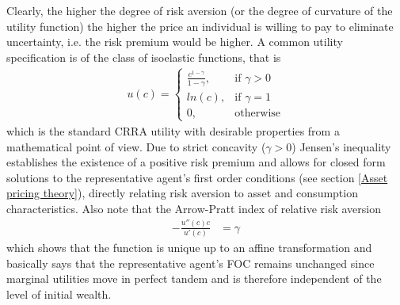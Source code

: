 Clearly, the higher the degree of risk aversion (or the degree of curvature of the utility function) the higher the price an individual is willing to pay to eliminate uncertainty, i.e. the risk premium would be higher. A common utility specification is of the class of isoelastic functions, that is 
\begin{align*}
    u(c)=
    \begin{cases}
        \frac{c^{1-\gamma}}{1-\gamma},& \text{if } \gamma > 0\\
        ln(c), & \text{if } \gamma = 1\\
        0, & \text{otherwise}
    \end{cases}
\end{align*}
which is the standard CRRA utility with desirable properties from a mathematical point of view. Due to strict concavity ($\gamma > 0$) Jensen's inequality establishes the existence of a positive risk premium and allows for closed form solutions to the representative agent's first order conditions (see section \ref{Asset pricing theory}), directly relating risk aversion to asset and consumption characteristics. Also note that the Arrow-Pratt index of relative risk aversion 
\begin{align*}
    -\frac{u''(c) c}{u'(c)} &= \gamma
\end{align*}
which shows that the function is unique up to an affine transformation and basically says that the representative agent's FOC remains unchanged since marginal utilities move in perfect tandem and is therefore independent of the level of initial wealth.

